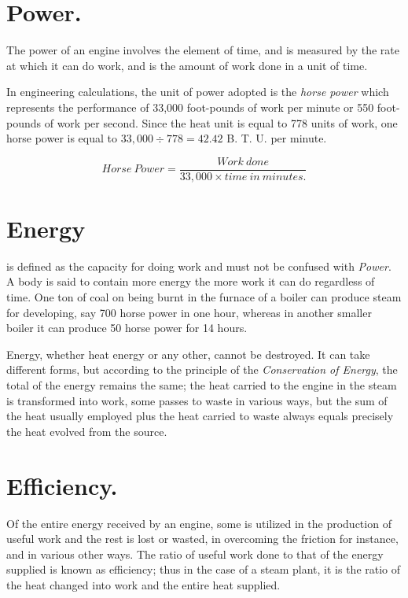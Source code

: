 \documentclass[11pt, a5paper]{book}
\begin{document}
\section{Power.}The power of an engine involves the element of time,
and is measured by the rate at which it can do work, and is the amount
of work done in a unit of time.\par

In engineering calculations, the unit of power adopted is the
\textit{horse power} which represents the performance of 33,000
foot-pounds of work per minute or 550 foot-pounds of work per second.
Since the heat unit is equal to 778 units of work, one horse power is
equal to $33,000 \div 778 = 42.42$ B. T. U. per minute.\par

\begin{equation*}
  Horse\:Power = \frac{Work\:done}{33,000 \times time\:in\:minutes.}
\end{equation*}

\section{Energy} is defined as the capacity for doing work and must not
be confused with \textit{Power}.  A body is said to contain more
energy the more work it can do regardless of time.  One ton of coal on
being burnt in the furnace of a boiler can produce steam for
developing, say 700 horse power in one hour, whereas in another
smaller boiler it can produce 50 horse power for 14 hours.\par

Energy, whether heat energy or any other, cannot be destroyed.  It can
take different forms, but according to the principle of the
\textit{Conservation of Energy}, the total of the energy remains the
same; the heat carried to the engine in the steam is transformed into
work, some passes to waste in various ways, but the sum of the heat
usually employed plus the heat carried to waste always equals
precisely the heat evolved from the source.\par

\section{Efficiency.}Of the entire energy received by an engine,
some is utilized in the production of useful work and the rest is lost
or wasted, in overcoming the friction for instance, and in various
other ways.  The ratio of useful work done to that of the energy
supplied is known as efficiency; thus in the case of a steam plant, it
is the ratio of the heat changed into work and the entire heat
supplied.\par
\end{document}
